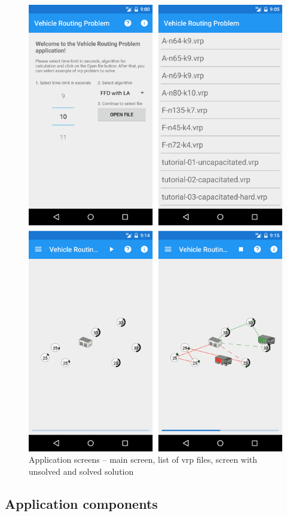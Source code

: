 \begin{figure}[h!]
    \centering
    \includegraphics[scale=0.15]{fig/screens.png}
    \caption{Application screens -- main screen, list of vrp files, screen with unsolved and solved solution}
    \label{screens}
\end{figure}

\subsection{Application components}

